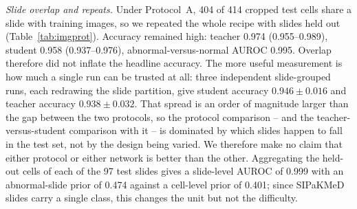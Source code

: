 \documentclass[lettersize,journal]{IEEEtran}
\newcommand{\SeedStudent}{$0.946\pm0.016$}
\newcommand{\SeedTeacher}{$0.938\pm0.032$}
\begin{document}
\begin{table}[t]
\caption{Cytology Expert, Protocol A Fixed Test Set ($n=504$)}
\label{tab:image}
\centering\footnotesize
\setlength{\tabcolsep}{4pt}
\end{table}

\emph{Slide overlap and repeats.} Under Protocol~A, 404 of 414 cropped test cells share a slide with training images, so we repeated the whole recipe with slides held out (Table~\ref{tab:imgprot}). Accuracy remained high: teacher 0.974 (0.955--0.989), student 0.958 (0.937--0.976), abnormal-versus-normal AUROC 0.995. Overlap therefore did not inflate the headline accuracy. The more useful measurement is how much a single run can be trusted at all: three independent slide-grouped runs, each redrawing the slide partition, give student accuracy \SeedStudent{} and teacher accuracy \SeedTeacher{}. That spread is an order of magnitude larger than the gap between the two protocols, so the protocol comparison -- and the teacher-versus-student comparison with it -- is dominated by which slides happen to fall in the test set, not by the design being varied. We therefore make no claim that either protocol or either network is better than the other. Aggregating the held-out cells of each of the 97 test slides gives a slide-level AUROC of 0.999 with an abnormal-slide prior of 0.474 against a cell-level prior of 0.401; since SIPaKMeD slides carry a single class, this changes the unit but not the difficulty.
\end{document}
